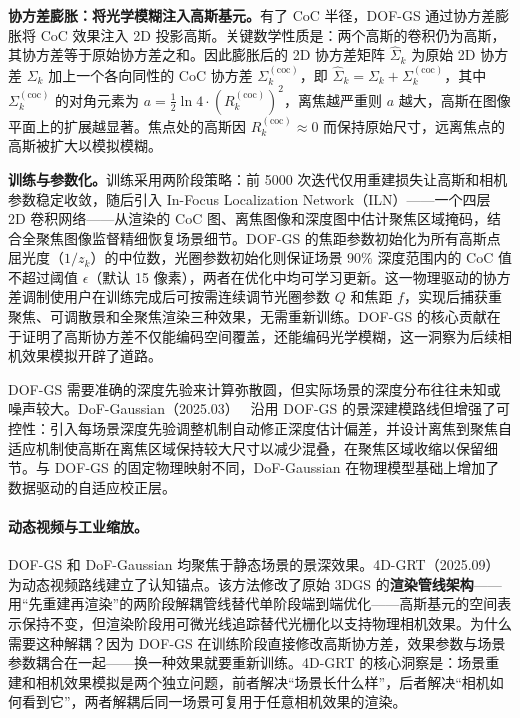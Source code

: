 \textbf{协方差膨胀：将光学模糊注入高斯基元。}有了 CoC 半径，DOF-GS 通过协方差膨胀将 CoC 效果注入 2D 投影高斯。关键数学性质是：两个高斯的卷积仍为高斯，其协方差等于原始协方差之和。因此膨胀后的 2D 协方差矩阵 $\hat{\Sigma}_k$ 为原始 2D 协方差 $\Sigma_k$ 加上一个各向同性的 CoC 协方差 $\Sigma_k^{(\text{coc})}$，即 $\hat{\Sigma}_k = \Sigma_k + \Sigma_k^{(\text{coc})}$，其中 $\Sigma_k^{(\text{coc})}$ 的对角元素为 $a = \frac{1}{2}\ln 4 \cdot (R_k^{(\text{coc})})^2$，离焦越严重则 $a$ 越大，高斯在图像平面上的扩展越显著。焦点处的高斯因 $R_k^{(\text{coc})} \approx 0$ 而保持原始尺寸，远离焦点的高斯被扩大以模拟模糊。

\textbf{训练与参数化。}训练采用两阶段策略：前 5000 次迭代仅用重建损失让高斯和相机参数稳定收敛，随后引入 In-Focus Localization Network（ILN）——一个四层 2D 卷积网络——从渲染的 CoC 图、离焦图像和深度图中估计聚焦区域掩码，结合全聚焦图像监督精细恢复场景细节。DOF-GS 的焦距参数初始化为所有高斯点屈光度（$1/z_k$）的中位数，光圈参数初始化则保证场景 $90\%$ 深度范围内的 CoC 值不超过阈值 $\epsilon$（默认 15 像素），两者在优化中均可学习更新。这一物理驱动的协方差调制使用户在训练完成后可按需连续调节光圈参数 $Q$ 和焦距 $f$，实现后捕获重聚焦、可调散景和全聚焦渲染三种效果，无需重新训练。DOF-GS 的核心贡献在于证明了高斯协方差不仅能编码空间覆盖，还能编码光学模糊，这一洞察为后续相机效果模拟开辟了道路。

DOF-GS 需要准确的深度先验来计算弥散圆，但实际场景的深度分布往往未知或噪声较大。DoF-Gaussian（2025.03）~\cite{2503_00746} 沿用 DOF-GS 的景深建模路线但增强了可控性：引入每场景深度先验调整机制自动修正深度估计偏差，并设计离焦到聚焦自适应机制使高斯在离焦区域保持较大尺寸以减少混叠，在聚焦区域收缩以保留细节。与 DOF-GS 的固定物理映射不同，DoF-Gaussian 在物理模型基础上增加了数据驱动的自适应校正层。

\paragraph{动态视频与工业缩放。}

DOF-GS 和 DoF-Gaussian 均聚焦于静态场景的景深效果。4D-GRT（2025.09）~\cite{2509_10759} 为动态视频路线建立了认知锚点。该方法修改了原始 3DGS 的\textbf{渲染管线架构}——用“先重建再渲染”的两阶段解耦管线替代单阶段端到端优化——高斯基元的空间表示保持不变，但渲染阶段用可微光线追踪替代光栅化以支持物理相机效果。为什么需要这种解耦？因为 DOF-GS 在训练阶段直接修改高斯协方差，效果参数与场景参数耦合在一起——换一种效果就要重新训练。4D-GRT 的核心洞察是：场景重建和相机效果模拟是两个独立问题，前者解决“场景长什么样”，后者解决“相机如何看到它”，两者解耦后同一场景可复用于任意相机效果的渲染。

